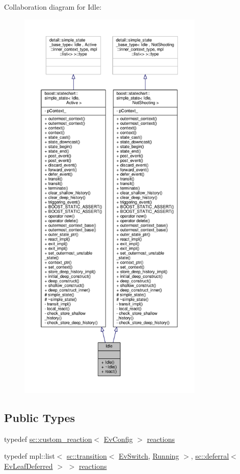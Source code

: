 Collaboration diagram for Idle\+:
\nopagebreak
\begin{figure}[H]
\begin{center}
\leavevmode
\includegraphics[height=550pt]{struct_idle__coll__graph}
\end{center}
\end{figure}
\subsection*{Public Types}
\begin{DoxyCompactItemize}
\item 
typedef \mbox{\hyperlink{classboost_1_1statechart_1_1custom__reaction}{sc\+::custom\+\_\+reaction}}$<$ \mbox{\hyperlink{struct_ev_config}{Ev\+Config}} $>$ \mbox{\hyperlink{struct_idle_ad2ecd64f82800bc98d1322ddd855d6c5}{reactions}}
\item 
typedef mpl\+::list$<$ \mbox{\hyperlink{classboost_1_1statechart_1_1transition}{sc\+::transition}}$<$ \mbox{\hyperlink{struct_ev_switch}{Ev\+Switch}}, \mbox{\hyperlink{struct_running}{Running}} $>$, \mbox{\hyperlink{classboost_1_1statechart_1_1deferral}{sc\+::deferral}}$<$ \mbox{\hyperlink{struct_ev_leaf_deferred}{Ev\+Leaf\+Deferred}} $>$ $>$ \mbox{\hyperlink{struct_idle_a72d8c4793174bd822c39ccc36dc83409}{reactions}}
\end{DoxyCompactItemize}
